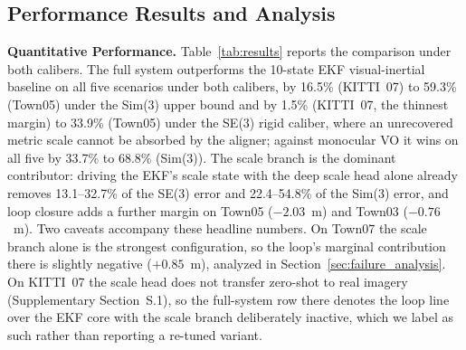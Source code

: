 \subsection{Performance Results and Analysis}

\textbf{Quantitative Performance.} Table~\ref{tab:results} reports the comparison under both calibers. The full system outperforms the 10-state EKF visual-inertial baseline on all five scenarios under both calibers, by 16.5\% (KITTI~07) to 59.3\% (Town05) under the Sim(3) upper bound and by 1.5\% (KITTI~07, the thinnest margin) to 33.9\% (Town05) under the SE(3) rigid caliber, where an unrecovered metric scale cannot be absorbed by the aligner; against monocular VO it wins on all five by 33.7\% to 68.8\% (Sim(3)). The scale branch is the dominant contributor: driving the EKF's scale state with the deep scale head alone already removes 13.1--32.7\% of the SE(3) error and 22.4--54.8\% of the Sim(3) error, and loop closure adds a further margin on Town05 ($-2.03$~m) and Town03 ($-0.76$~m). Two caveats accompany these headline numbers. On Town07 the scale branch alone is the strongest configuration, so the loop's marginal contribution there is slightly negative ($+0.85$~m), analyzed in Section~\ref{sec:failure_analysis}. On KITTI~07 the scale head does not transfer zero-shot to real imagery (Supplementary Section~S.1), so the full-system row there denotes the loop line over the EKF core with the scale branch deliberately inactive, which we label as such rather than reporting a re-tuned variant.


